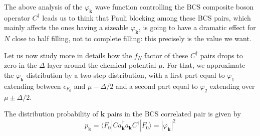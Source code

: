 \documentclass[aps,prb,preprint,groupedaddress,amsmath]{revtex4-1}
\newcommand{\vk}{\ensuremath{\mathbf{k}}}
\newcommand{\dg}{\ensuremath{\dagger}}
\begin{document}
The above analysis of the $\varphi_\vk$ wave function controlling the BCS composite boson operator $C^\dg$ leads us to think that Pauli blocking among these BCS pairs, which mainly affects the ones having a sizeable $\varphi_\vk$, is going to have a dramatic effect for $N$ close to half filling, not to complete filling: this precisely is the value we want. 

Let us now study more in details how the $f_N$ factor of these $C^\dg$ pairs drops to zero in the $\Delta$ layer around the chemical potential $\mu$.  For that, we approximate the $\varphi_\vk$ distribution by a two-step distribution, with a first part equal to $\varphi_1$ extending between $\epsilon_{F_0}$ and $\mu-\Delta/2$ and a second part equal to $\varphi_2$ extending over $\mu\pm\Delta/2$. 


  The distribution probability of $\vk$ pairs in the BCS correlated pair is  given by 
\begin{equation}
p_\vk=\langle{}F_0|Ca^\dg_\vk{}a_\vk{}C^\dg|F_0\rangle=|\varphi_\vk|^2
\end{equation}
%


\end{document}
